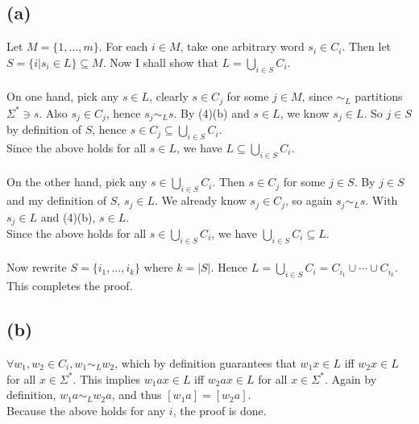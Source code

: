 \documentclass{article}
\begin{document}
        \subsection*{(a)}
            Let $M = \{1, \dots, m\}$.
            For each $i \in M$, take one arbitrary word $s_i \in C_i$.
            Then let $S = \{i | s_i \in L\} \subseteq M$.
            Now I shall show that $L = \bigcup_{i \in S}{C_i}$. \\ \\
            On one hand, pick any $s \in L$, clearly $s \in C_j$ for some $j \in M$,
            since $\sim_L$ partitions $\Sigma^* \ni s$.
            Also $s_j \in C_j$, hence $s_j \sim_L s$. 
            By (4)(b) and $s \in L$, we know $s_j \in L$.
            So $j \in S$ by definition of $S$,
            hence $s \in C_j \subseteq \bigcup_{i \in S}{C_i}$. \\
            Since the above holds for all $s \in L$,
            we have $L \subseteq \bigcup_{i \in S}{C_i}$. \\ \\
            On the other hand, pick any $s \in \bigcup_{i \in S}{C_i}$.
            Then $s \in C_j$ for some $j \in S$.
            By $j \in S$ and my definition of $S$, $s_j \in L$.
            We already know $s_j \in C_j$, so again $s_j \sim_L s$.
            With $s_j \in L$ and (4)(b), $s \in L$. \\
            Since the above holds for all $s \in \bigcup_{i \in S}{C_i}$,
            we have $\bigcup_{i \in S}{C_i} \subseteq L$. \\ \\
            Now rewrite $S = \{i_1, \dots, i_k\}$ where $k = |S|$.
            Hence $L = \bigcup_{i \in S}{C_i} = C_{i_1} \cup \cdots \cup C_{i_k}$.
            This completes the proof.
        
        \subsection*{(b)}
            $\forall w_1, w_2 \in C_i, w_1 \sim_L w_2$,
            which by definition guarantees that
            $w_1x \in L$ iff $w_2x \in L$ for all $x \in \Sigma^*$.
            This implies $w_1ax \in L$ iff $w_2ax \in L$ for all $x \in \Sigma^*$.
            Again by definition, $w_1a \sim_L w_2a$,
            and thus $[w_1a] = [w_2a]$. \\
            Because the above holds for any $i$, the proof is done.
        
\end{document}
